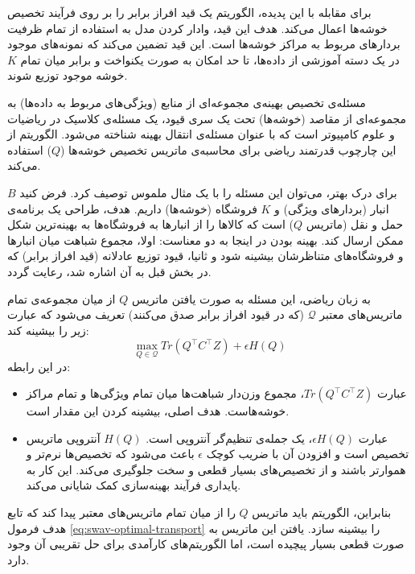 برای مقابله با این پدیده، الگوریتم 
یک قید افراز برابر
را بر روی فرآیند تخصیص خوشه‌ها اعمال می‌کند. هدف این قید، وادار کردن مدل به استفاده از تمام ظرفیت بردارهای مربوط به مراکز خوشه‌ها است. این قید تضمین می‌کند که نمونه‌های موجود در یک دسته آموزشی از داده‌ها، تا حد امکان به صورت یکنواخت و برابر میان تمام 
$K$
خوشه موجود توزیع شوند.

مسئله‌ی تخصیص بهینه‌ی مجموعه‌ای از منابع (ویژگی‌های مربوط به داده‌ها) به مجموعه‌ای از مقاصد (خوشه‌ها) تحت یک سری قیود، یک مسئله‌ی کلاسیک در ریاضیات و علوم کامپیوتر است که با عنوان مسئله‌ی انتقال بهینه
شناخته می‌شود. الگوریتم  از این چارچوب قدرتمند ریاضی برای محاسبه‌ی ماتریس تخصیص خوشه‌ها
($Q$) استفاده می‌کند.

برای درک بهتر، می‌توان این مسئله را با یک مثال ملموس توصیف کرد. فرض کنید 
$B$
 انبار (بردارهای ویژگی) و 
$K$
 فروشگاه (خوشه‌ها) داریم. هدف، طراحی یک برنامه‌ی حمل و نقل
 (ماتریس $Q$)
 است که کالاها را از انبارها به فروشگاه‌ها به بهینه‌ترین شکل ممکن ارسال کند. بهینه بودن در اینجا به دو معناست: اولا، مجموع شباهت میان انبارها و فروشگاه‌های متناظرشان بیشینه شود و ثانيا، قیود توزیع عادلانه (قید افراز برابر) که در بخش قبل به آن اشاره شد، رعایت گردد.

 به زبان ریاضی، این مسئله به صورت یافتن ماتریس $Q$ از میان مجموعه‌ی تمام ماتریس‌های معتبر 
$\mathcal{Q}$
(که در قیود افراز برابر صدق می‌کنند) تعریف می‌شود که عبارت زیر را بیشینه کند:
\begin{equation}
\max_{Q \in \mathcal{Q}} Tr(Q^\top C^\top Z) + \epsilon H(Q)
\label{eq:swav-optimal-transport}
\end{equation}
در این رابطه:
\begin{itemize}
    \item عبارت
    $Tr(Q^\top C^\top Z)$،
    مجموع وزن‌دار شباهت‌ها میان تمام ویژگی‌ها و تمام مراکز خوشه‌هاست. هدف اصلی، بیشینه کردن این مقدار است.
    \item عبارت
    $\epsilon H(Q)$،
    یک جمله‌ی تنظیم‌گر آنتروپی است.
    $H(Q)$ آنتروپی ماتریس تخصیص است و افزودن آن با ضریب کوچک $ϵ$ باعث می‌شود که تخصیص‌ها نرم‌تر و هموارتر باشند و از تخصیص‌های بسیار قطعی و سخت جلوگیری می‌کند. این کار به پایداری فرآیند بهینه‌سازی کمک شایانی می‌کند.
\end{itemize}
بنابراین، الگوریتم باید ماتریس 
$Q$
را از میان تمام ماتریس‌های معتبر پیدا کند که تابع هدف فرمول \ref{eq:swav-optimal-transport}
را بیشینه سازد. یافتن این ماتریس به صورت قطعی بسیار پیچیده است، اما الگوریتم‌های کارآمدی برای حل تقریبی آن وجود دارد.


